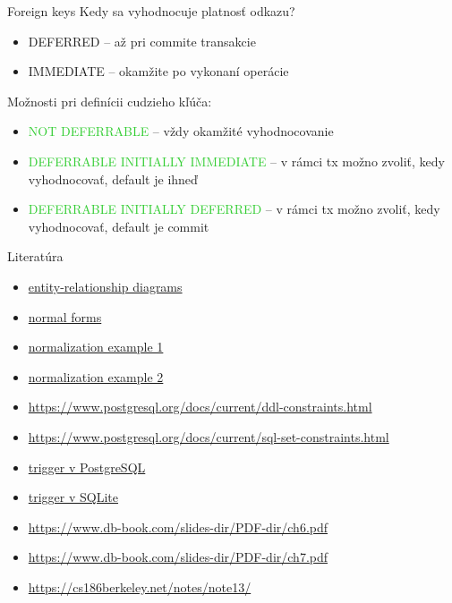 \documentclass[12pt]{beamer}
\def\green#1{\textcolor{LimeGreen}{#1}}
\begin{document}
\begin{frame}[fragile]{Foreign keys}
Kedy sa vyhodnocuje platnosť odkazu?
\begin{itemize}
\item \alert{DEFERRED} -- až pri commite transakcie
\item \alert{IMMEDIATE} -- okamžite po vykonaní operácie
\end{itemize}
\pause
Možnosti pri definícii cudzieho kľúča:
\begin{itemize}
\item \green{NOT DEFERRABLE} -- vždy okamžité vyhodnocovanie
\item \green{DEFERRABLE INITIALLY IMMEDIATE} -- v rámci tx možno zvoliť, kedy vyhodnocovať, default je ihneď
\item \green{DEFERRABLE INITIALLY DEFERRED} -- v rámci tx možno zvoliť, kedy vyhodnocovať, default je commit
\end{itemize}
\end{frame}


\begin{frame}{Literatúra}
\begin{itemize}
\item {\scriptsize\href{https://www.lucidchart.com/pages/er-diagrams}{entity-relationship diagrams}}
\item {\scriptsize\href{https://en.wikipedia.org/wiki/Database_normalization}{normal forms}}
\item {\scriptsize\href{https://mariadb.com/kb/en/database-normalization-overview/}{normalization example 1}}
\item {\scriptsize\href{https://www.databasestar.com/database-normalization/}{normalization example 2}}
\item {\scriptsize\url{https://www.postgresql.org/docs/current/ddl-constraints.html}}
\item {\scriptsize\url{https://www.postgresql.org/docs/current/sql-set-constraints.html}}
\item {\scriptsize\href{https://www.postgresqltutorial.com/postgresql-triggers/creating-first-trigger-postgresql/}{trigger v PostgreSQL}}
\item {\scriptsize\href{https://www.sqlitetutorial.net/sqlite-trigger/}{trigger v SQLite}}
\item {\scriptsize\url{https://www.db-book.com/slides-dir/PDF-dir/ch6.pdf}}
\item {\scriptsize\url{https://www.db-book.com/slides-dir/PDF-dir/ch7.pdf}}
\item {\scriptsize\url{https://cs186berkeley.net/notes/note13/}}
\end{itemize}
\end{frame}
\end{document}
